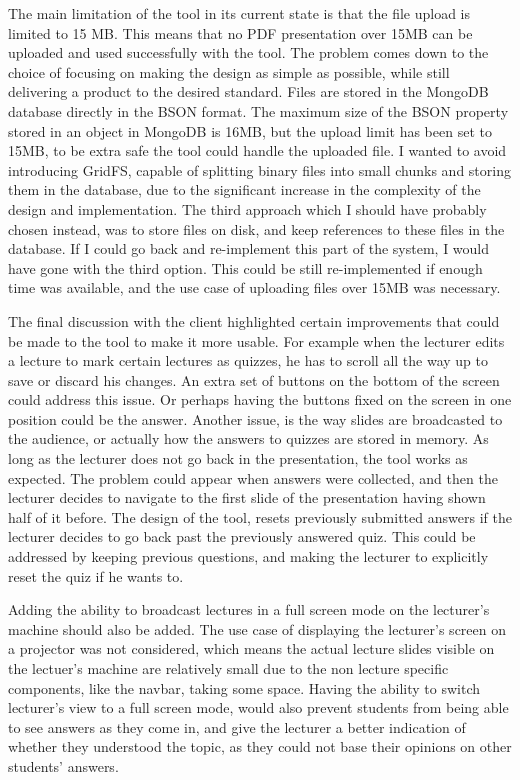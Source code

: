 The main limitation of the tool in its current state is that the file upload
is limited to 15 MB. This means that no PDF presentation over 15MB can be uploaded
and used successfully with the tool. The problem comes down to the choice of
focusing on making the design as simple as possible, while still delivering a
product to the desired standard. Files are stored in the MongoDB database directly
in the BSON format. The maximum size of the BSON property stored in an object in
MongoDB is 16MB, but the upload limit has been set to 15MB, to be extra safe the tool could
handle the uploaded file. I wanted to avoid introducing GridFS, capable of
splitting binary files into small chunks and storing them in the database, due
to the significant increase in the complexity of the design and implementation.
The third approach which I should have probably chosen instead, was to store files
on disk, and keep references to these files in the database. If I could go back
and re-implement this part of the system, I would have gone with the third option.
This could be still re-implemented if enough time was available, and the use case
of uploading files over 15MB was necessary.

The final discussion with the client highlighted certain improvements that could
be made to the tool to make it more usable. For example when the lecturer edits
a lecture to mark certain lectures as quizzes, he has to scroll all the way up to
save or discard his changes. An extra set of buttons on the bottom of the screen
could address this issue. Or perhaps having the buttons fixed on the screen
in one position could be the answer. Another issue, is the way slides are broadcasted
to the audience, or actually how the answers to quizzes are stored in memory.
As long as the lecturer does not go back in the presentation, the tool works
as expected. The problem could appear when answers were collected, and then the
lecturer decides to navigate to the first slide of the presentation having shown half
of it before. The design of the tool, resets previously submitted answers if
the lecturer decides to go back past the previously answered quiz. This could be addressed by
keeping previous questions, and making the lecturer to explicitly reset the
quiz if he wants to.

Adding the ability to broadcast lectures in a full screen mode on the lecturer's
machine should also be added. The use case of displaying the lecturer's screen
on a projector was not considered, which means the actual lecture slides visible
on the lectuer's machine are relatively small due to the non lecture specific components, like the navbar,
taking some space. Having the ability to switch lecturer's view to a full screen mode,
would also prevent students from being able to see answers as they come in,
and give the lecturer a better indication of whether they understood the topic, as they
could not base their opinions on other students' answers.

